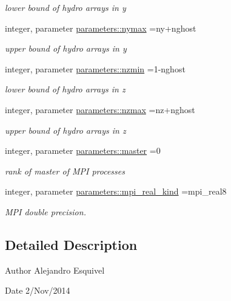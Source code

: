 \begin{DoxyCompactItemize}
\begin{DoxyCompactList}\small\item\em lower bound of hydro arrays in y \end{DoxyCompactList}\item 
\hypertarget{namespaceparameters_ab1106d13b42bd50bee92066b8df41d80}{}integer, parameter \hyperlink{namespaceparameters_ab1106d13b42bd50bee92066b8df41d80}{parameters\+::nymax} =ny+nghost\label{namespaceparameters_ab1106d13b42bd50bee92066b8df41d80}

\begin{DoxyCompactList}\small\item\em upper bound of hydro arrays in y \end{DoxyCompactList}\item 
\hypertarget{namespaceparameters_a2e2d7c16e3034394c493dcc0f8f3368e}{}integer, parameter \hyperlink{namespaceparameters_a2e2d7c16e3034394c493dcc0f8f3368e}{parameters\+::nzmin} =1-\/nghost\label{namespaceparameters_a2e2d7c16e3034394c493dcc0f8f3368e}

\begin{DoxyCompactList}\small\item\em lower bound of hydro arrays in z \end{DoxyCompactList}\item 
\hypertarget{namespaceparameters_ad1a2fd8c36d344e74949aab19206d23c}{}integer, parameter \hyperlink{namespaceparameters_ad1a2fd8c36d344e74949aab19206d23c}{parameters\+::nzmax} =nz+nghost\label{namespaceparameters_ad1a2fd8c36d344e74949aab19206d23c}

\begin{DoxyCompactList}\small\item\em upper bound of hydro arrays in z \end{DoxyCompactList}\item 
\hypertarget{namespaceparameters_a01664304fae28ea43d9a76e212d7cad9}{}integer, parameter \hyperlink{namespaceparameters_a01664304fae28ea43d9a76e212d7cad9}{parameters\+::master} =0\label{namespaceparameters_a01664304fae28ea43d9a76e212d7cad9}

\begin{DoxyCompactList}\small\item\em rank of master of M\+P\+I processes \end{DoxyCompactList}\item 
integer, parameter \hyperlink{namespaceparameters_a406c7844e3ea27cce4fa7abbe9149955}{parameters\+::mpi\+\_\+real\+\_\+kind} =mpi\+\_\+real8
\begin{DoxyCompactList}\small\item\em M\+P\+I double precision. \end{DoxyCompactList}\end{DoxyCompactItemize}


\subsection{Detailed Description}
\begin{DoxyAuthor}{Author}
Alejandro Esquivel 
\end{DoxyAuthor}
\begin{DoxyDate}{Date}
2/\+Nov/2014 
\end{DoxyDate}
